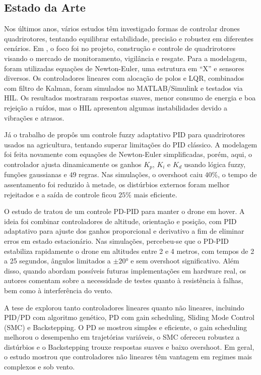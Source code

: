 \subsection{Estado da Arte}
Nos últimos anos, vários estudos têm investigado formas de controlar drones quadrirotores, tentando equilibrar 
estabilidade, precisão e robustez em diferentes cenários. Em \cite{usp}, o foco foi no projeto, construção e 
controle de quadrirotores visando o mercado de monitoramento, vigilância e resgate. Para a modelagem, foram 
utilizadas equações de Newton-Euler, uma estrutura em ``X'' e sensores diversos. Os controladores lineares 
com alocação de polos e LQR, combinados com filtro de Kalman, foram simulados no MATLAB/Simulink e testados 
via HIL. Os resultados mostraram respostas suaves, menor consumo de energia e boa rejeição a ruídos, mas o HIL 
apresentou algumas instabilidades devido a vibrações e atrasos.

Já o trabalho de \cite{he} propôs um controle fuzzy adaptativo PID para quadrirotores usados na agricultura, tentando 
superar limitações do PID clássico. A modelagem foi feita novamente com equações de Newton-Euler simplificadas, porém, 
aqui, o controlador ajusta dinamicamente os ganhos $K_p$, $K_i$ e $K_d$ usando lógica fuzzy, funções gaussianas e $49$ 
regras. Nas simulações, o overshoot caiu $40\%$, o tempo de assentamento foi reduzido à metade, os distúrbios externos 
foram melhor rejeitados e a saída de controle ficou $25\%$ mais eficiente.

O estudo de \cite{memon} tratou de um controle PD-PID para manter o drone em hover. A ideia foi combinar controladores 
de altitude, orientação e posição, com PID adaptativo para ajuste dos ganhos proporcional e derivativo a fim de eliminar 
erros em estado estacionário. Nas simulações, percebeu-se que o PD-PID estabiliza rapidamente o drone em altitudes entre 
2 e 4 metros, com tempos de 2 a 25 segundos, ângulos limitados a $\pm20°$ e sem overshoot significativo. Além disso, 
quando abordam possíveis futuras implementações em hardware real, os autores comentam sobre a necessidade de testes 
quanto à resistência à falhas, bem como à interferência do vento.

A tese de \cite{elkholy} explorou tanto controladores lineares quanto não lineares, incluindo PID/PD com algoritmo 
genético, PD com gain scheduling, Sliding Mode Control (SMC) e Backstepping. O PD se mostrou simples e eficiente, o 
gain scheduling melhorou o desempenho em trajetórias variáveis, o SMC ofereceu robustez a distúrbios e o Backstepping 
trouxe respostas suaves e baixo overshoot. Em geral, o estudo mostrou que controladores não lineares têm vantagem em 
regimes mais complexos e sob vento.

